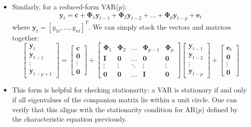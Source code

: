 \documentclass[notitlepage]{article}
\begin{document}
\begin{itemize}
\begin{itemize}
        \item Similarly, for a reduced-form VAR(\(p\)):
        \[
        \mathbf{y}_t = \mathbf{c} + \boldsymbol{\Phi}_1 \mathbf{y}_{t-1} + \boldsymbol{\Phi}_2 \mathbf{y}_{t-2} + \dots + \boldsymbol{\Phi}_p \mathbf{y}_{t-p} + \mathbf{e}_t
        \]
        where \(\mathbf{y}_t = [y_{1t}, \dots, y_{nt}]^T\). We can simply stack the vectors and matrices together:
        \[
        \begin{bmatrix} \mathbf{y}_t \\ \mathbf{y}_{t-1} \\ \vdots \\ \mathbf{y}_{t-p+1} \end{bmatrix} = 
        \begin{bmatrix} \mathbf{c} \\ \mathbf{0} \\ \vdots \\ \mathbf{0} \end{bmatrix} + 
        \begin{bmatrix} \boldsymbol{\Phi}_1 & \boldsymbol{\Phi}_2 & \dots & \boldsymbol{\Phi}_{p-1} & \boldsymbol{\Phi}_p \\ \mathbf{I} & \mathbf{0} & \dots & \mathbf{0} & \mathbf{0} \\
        \vdots & \vdots & \ddots & \vdots & \vdots \\ \mathbf{0} & \mathbf{0} & \dots & \mathbf{I} & \mathbf{0}\end{bmatrix} 
        \begin{bmatrix} \mathbf{y}_{t-1} \\ \mathbf{y}_{t-2} \\ \vdots \\ \mathbf{y}_{t-p} \end{bmatrix} + 
        \begin{bmatrix} \mathbf{e}_t  \\ \mathbf{0} \\ \vdots \\ \mathbf{0} \end{bmatrix}
        \]
        \item This form is helpful for checking stationarity: a VAR is stationary if and only if all eigenvalues of the companion matrix lie within a unit circle. One can verify that this aligns with the stationarity condition for AR(\(p\)) defined by the characteristic equation previously.
    \end{itemize}
\end{itemize}
\end{document}

